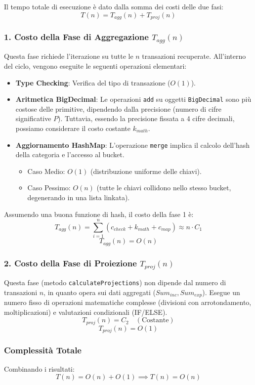 Il tempo totale di esecuzione è dato dalla somma dei costi delle due fasi:
\[ T(n) = T_{agg}(n) + T_{proj}(n) \]

\subsubsection{1. Costo della Fase di Aggregazione $T_{agg}(n)$}
Questa fase richiede l'iterazione su tutte le $n$ transazioni recuperate.
All'interno del ciclo, vengono eseguite le seguenti operazioni elementari:
\begin{itemize}
    \item \textbf{Type Checking}: Verifica del tipo di transazione ($O(1)$).
    \item \textbf{Aritmetica BigDecimal}: Le operazioni \texttt{add} su oggetti \texttt{BigDecimal} sono più costose delle primitive, dipendendo dalla precisione (numero di cifre significative $P$). Tuttavia, essendo la precisione fissata a 4 cifre decimali, possiamo considerare il costo costante $k_{math}$.
    \item \textbf{Aggiornamento HashMap}: L'operazione \texttt{merge} implica il calcolo dell'hash della categoria e l'accesso al bucket.
    \begin{itemize}
        \item Caso Medio: $O(1)$ (distribuzione uniforme delle chiavi).
        \item Caso Pessimo: $O(n)$ (tutte le chiavi collidono nello stesso bucket, degenerando in una lista linkata).
    \end{itemize}
\end{itemize}

Assumendo una buona funzione di hash, il costo della fase 1 è:
\[ T_{agg}(n) = \sum_{i=1}^{n} (c_{check} + k_{math} + c_{map}) \approx n \cdot C_1 \]
\[ T_{agg}(n) = O(n) \]

\subsubsection{2. Costo della Fase di Proiezione $T_{proj}(n)$}
Questa fase (metodo \texttt{calculateProjections}) non dipende dal numero di transazioni $n$, in quanto opera sui dati aggregati ($Sum_{inc}, Sum_{exp}$).
Esegue un numero fisso di operazioni matematiche complesse (divisioni con arrotondamento, moltiplicazioni) e valutazioni condizionali (IF/ELSE).
\[ T_{proj}(n) = C_2 \quad (\text{Costante}) \]
\[ T_{proj}(n) = O(1) \]

\subsubsection{Complessità Totale}
Combinando i risultati:
\[ T(n) = O(n) + O(1) \implies T(n) = O(n) \]

